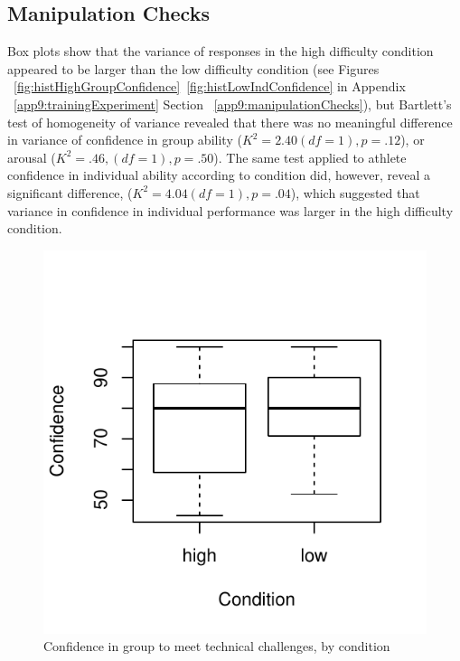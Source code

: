 \subsection{Manipulation Checks\label{app9:manipulationChecks}}
%







Box plots show that the variance of responses in the high difficulty condition appeared to be larger than the low difficulty condition (see Figures ~\ref{fig:histHighGroupConfidence}\nobreakdash~\ref{fig:histLowIndConfidence} in Appendix ~\ref{app9:trainingExperiment} Section ~\ref{app9:manipulationChecks}), but Bartlett's test of homogeneity of variance revealed that there was no meaningful difference in variance of confidence in group ability ($K^2 = 2.40 (df = 1), p = .12$), or arousal ($K^2 = .46, (df = 1), p = .50$).  The same test applied to athlete confidence in individual ability according to condition did, however, reveal a significant difference, ($K^2 = 4.04 (df = 1), p = .04$), which suggested that variance in confidence in individual performance was larger in the high difficulty condition.


\begin{figure}
  \centering
   \includegraphics[width=0.5\linewidth,keepaspectratio] {images/groupConfChallengesBoxplot-1}
  \caption{Confidence in group to meet technical challenges, by condition}
  \label{fig:groupConfChallengesBoxplot}
\end{figure}

